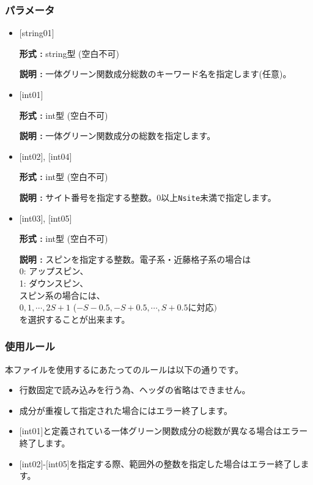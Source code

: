 \subsubsection{パラメータ}
 \begin{itemize}

   \item  $[$string01$]$
   
    {\bf 形式 :} string型 (空白不可)

   {\bf 説明 :} 一体グリーン関数成分総数のキーワード名を指定します(任意)。

   \item  $[$int01$]$
   
    {\bf 形式 :} int型 (空白不可)

   {\bf 説明 :} 一体グリーン関数成分の総数を指定します。

  \item  $[$int02$]$, $[$int04$]$

 {\bf 形式 :} int型 (空白不可)

{\bf 説明 :} サイト番号を指定する整数。0以上\verb|Nsite|{未満}で指定します。
 
  \item  $[$int03$]$, $[$int05$]$

 {\bf 形式 :} int型 (空白不可)

{\bf 説明 :} スピンを指定する整数。電子系・近藤格子系の場合は\\
0: アップスピン、\\
1: ダウンスピン、\\
スピン系の場合には、\\
$0, 1, \cdots, 2S+1$ ($-S-0.5, -S+0.5, \cdots, S+0.5$に対応$)$\\
を選択することが出来ます。

\end{itemize}

\subsubsection{使用ルール}
本ファイルを使用するにあたってのルールは以下の通りです。
\begin{itemize}
\item 行数固定で読み込みを行う為、ヘッダの省略はできません。
\item 成分が重複して指定された場合にはエラー終了します。
\item $[$int01$]$と定義されている一体グリーン関数成分の総数が異なる場合はエラー終了します。
\item $[$int02$]$-$[$int05$]$を指定する際、範囲外の整数を指定した場合はエラー終了します。
\end{itemize}

